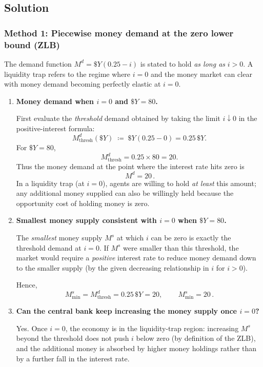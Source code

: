 \documentclass[12pt]{article}
\begin{document}
\subsection*{Solution}

\subsubsection*{Method 1: Piecewise money demand at the zero lower bound (ZLB)}
The demand function \(M^d=\$Y(0.25-i)\) is stated to hold \emph{as long as} \(i>0\). A liquidity trap refers to the regime where \(i=0\) and the money market can clear with money demand becoming perfectly elastic at \(i=0\).

\begin{enumerate}[label=(\alph*)]
\item \textbf{Money demand when \(i=0\) and \(\$Y=80\).}

First evaluate the \emph{threshold} demand obtained by taking the limit \(i\downarrow 0\) in the positive-interest formula:
\[
M^d_{\text{thresh}}(\$Y)\;\coloneqq\;\$Y(0.25-0)=0.25\,\$Y.
\]
For \(\$Y=80\),
\[
M^d_{\text{thresh}} = 0.25\times 80 = 20.
\]
Thus the money demand at the point where the interest rate hits zero is
\[
\boxed{\,M^d=20\,}.
\]
In a liquidity trap (at \(i=0\)), agents are willing to hold \emph{at least} this amount; any additional money supplied can also be willingly held because the opportunity cost of holding money is zero.

\item \textbf{Smallest money supply consistent with \(i=0\) when \(\$Y=80\).}

The \emph{smallest} money supply \(M^s\) at which \(i\) can be zero is exactly the threshold demand at \(i=0\). If \(M^s\) were smaller than this threshold, the market would require a \emph{positive} interest rate to reduce money demand down to the smaller supply (by the given decreasing relationship in \(i\) for \(i>0\)).

Hence,
\[
M^s_{\min} = M^d_{\text{thresh}} = 0.25\,\$Y = 20,
\qquad
\boxed{\,M^s_{\min}=20\,}.
\]

\item \textbf{Can the central bank keep increasing the money supply once \(i=0\)?}

Yes. Once \(i=0\), the economy is in the liquidity-trap region: increasing \(M^s\) beyond the threshold does not push \(i\) below zero (by definition of the ZLB), and the additional money is absorbed by higher money holdings rather than by a further fall in the interest rate.


\end{enumerate}
\end{document}
